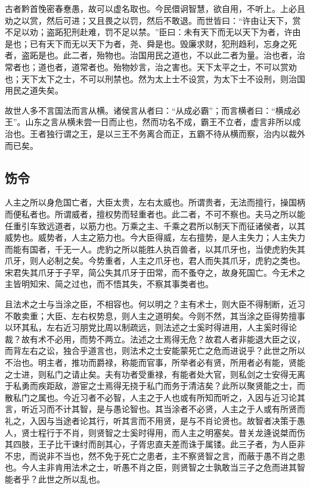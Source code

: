 \documentclass[]{article}
\begin{document}
古者黔首悗密春惷愚，故可以虚名取也。今民儇诇智慧，欲自用，不听上。上必且劝之以赏，然后可进；又且畏之以罚，然后不敢退。而世皆曰：``许由让天下，赏不足以劝；盗跖犯刑赴难，罚不足以禁。''臣曰：未有天下而无以天下为者，许由是也；已有天下而无以天下为者，尧、舜是也。毁廉求财，犯刑趋利，忘身之死者，盗跖是也。此二者，殆物也。治国用民之道也，不以此二者为量。治也者，治常者也；道也者，道常者也。殆物妙言，治之害也。天下太平之士，不可以赏劝也；天下太下之士，不可以刑禁也。然为太上士不设赏，为太下士不设刑，则治国用民之道失矣。

故世人多不言国法而言从横。诸侯言从者曰：``从成必霸''；而言横者曰：``横成必王''。山东之言从横未尝一日而止也，然而功名不成，霸王不立者，虚言非所以成治也。王者独行谓之王，是以三王不务离合而正，五霸不待从横而察，治内以裁外而已矣。

\hypertarget{header-n1596}{%
\subsection{饬令}\label{header-n1596}}

人主之所以身危国亡者，大臣太贵，左右太威也。所谓贵者，无法而擅行，操国柄而便私者也。所谓威者，擅权势而轻重者也。此二者，不可不察也。夫马之所以能任重引车致远道者，以筋力也。万乘之主、千乘之君所以制天下而征诸侯者，以其威势也。威势者，人主之筋力也。今大臣得威，左右擅势，是人主失力；人主失力而能有国者，千无一人。虎豹之所以能胜人执百兽者，以其爪牙也，当使虎豹失其爪牙，则人必制之矣。今势重者，人主之爪牙也，君人而失其爪牙，虎豹之类也。宋君失其爪牙于子罕，简公失其爪牙于田常，而不蚤夺之，故身死国亡。今无术之主皆明知宋、简之过也，而不悟其失，不察其事类者也。

且法术之士与当涂之臣，不相容也。何以明之？主有术士，则大臣不得制断，近习不敢卖重；大臣、左右权势息，则人主之道明矣。今则不然，其当涂之臣得势擅事以环其私，左右近习朋党比周以制疏远，则法述之士奚时得进用，人主奚时得论裁？故有术不必用，而势不两立。法述之士焉得无危？故君人者非能退大臣之议，而背左右之讼，独合乎道言也，则法术之士安能蒙死亡之危而进说乎？此世之所以不治也。明主者，推功而爵禄，称能而官事，所举者必有贤，所用者必有能，贤能之士进，则私门之请止矣。夫有功者受重禄，有能者处大官，则私剑之士安得无离于私勇而疾距敌，游宦之士焉得无挠于私门而务于清洁矣？此所以聚贤能之士，而散私门之属也。今近习者不必智，人主之于人也或有所知而听之，入因与近习论其言，听近习而不计其智，是与愚论智也。其当涂者不必贤，人主之于人或有所贤而礼之，入因与当途者论其行，听其言而不用贤，是与不肖论贤也。故智者决策于愚人，贤士程行于不肖，则贤智之士奚时得用，而人主之明塞矣。昔关龙逄说桀而伤其四肢，王子比干谏纣而剖其心，子胥忠直夫差而诛于属镂。此三子者，为人臣非不忠，而说非不当也，然不免于死亡之患者，主不察贤智之言，而蔽于愚不肖之患也。今人主非肯用法术之士，听愚不肖之臣，则贤智之士孰敢当三子之危而进其智能者乎？此世之所以乱也。
\end{document}
